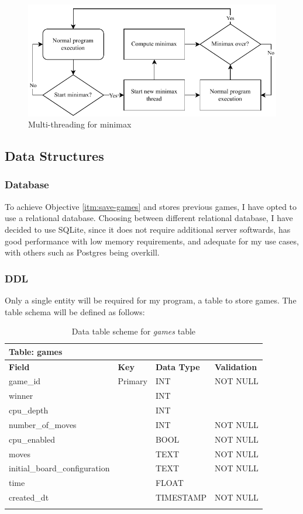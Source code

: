 \documentclass[../main/main.tex]{subfiles}
\begin{document}
\begin{figure}[H]
    \centering
    \includegraphics[width=\columnwidth]{../design/assets/multi_threading.pdf}
    \caption{Multi-threading for minimax}
    \label{fig:multi-threading}
\end{figure}

\subsection{Data Structures}
\subsubsection{Database}
To achieve Objective \ref{itm:save-games} and stores previous games, I have opted to use a relational database. Choosing between different relational database, I have decided to use SQLite, since it does not require additional server softwards, has good performance with low memory requirements, and adequate for my use cases, with others such as Postgres being overkill.

\subsubsection*{DDL}
Only a single entity will be required for my program, a table to store games. The table schema will be defined as follows:

\begin{longtable}[c]{l|l|l|l}
    \multicolumn{4}{l}{\textbf{Table: games}}\\
    \toprule
    \textbf{Field} & \textbf{Key} & \textbf{Data Type} & \textbf{Validation}\\
    \midrule
    \endfirsthead
    \endhead

    game\_id & Primary & INT & NOT NULL\\
    winner &  & INT & \\
    cpu\_depth &  & INT & \\
    number\_of\_moves &  & INT & NOT NULL\\
    cpu\_enabled &  & BOOL & NOT NULL\\
    moves &  & TEXT & NOT NULL\\
    initial\_board\_configuration &  & TEXT & NOT NULL\\
    time &  & FLOAT & \\
    created\_dt &  & TIMESTAMP & NOT NULL\\

    \bottomrule
    
\caption{Data table scheme for \textit{games} table}
\label{tab:games-schema}
\end{longtable}
\end{document}
